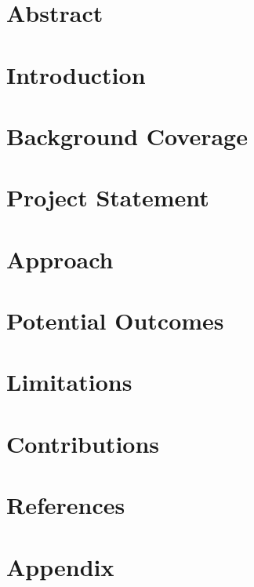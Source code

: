 



\maketitle

\tableofcontents

\newpage

\section{Abstract}

\section{Introduction}

\section{Background Coverage}

\section{Project Statement}

\section{Approach}

\section{Potential Outcomes}

\section{Limitations}

\section{Contributions}

\section{References}

\section{Appendix}


